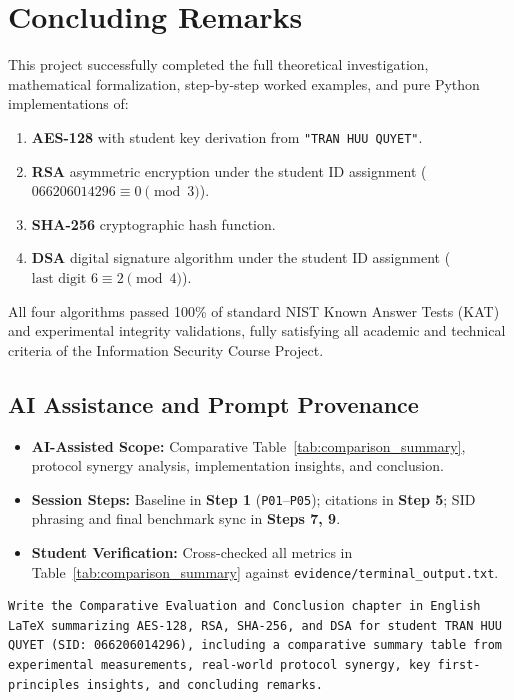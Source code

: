 \section{Concluding Remarks}
This project successfully completed the full theoretical investigation, mathematical formalization, step-by-step worked examples, and pure Python implementations of:
\begin{enumerate}
    \item \textbf{AES-128} with student key derivation from \texttt{"TRAN HUU QUYET"}.
    \item \textbf{RSA} asymmetric encryption under the student ID assignment ($066206014296 \equiv 0 \pmod 3$).
    \item \textbf{SHA-256} cryptographic hash function.
    \item \textbf{DSA} digital signature algorithm under the student ID assignment ($\text{last digit } 6 \equiv 2 \pmod 4$).
\end{enumerate}
All four algorithms passed 100\% of standard NIST Known Answer Tests (KAT) and experimental integrity validations, fully satisfying all academic and technical criteria of the Information Security Course Project.

\subsection*{AI Assistance and Prompt Provenance}
\begin{itemize}
    \item \textbf{AI-Assisted Scope:} Comparative Table~\ref{tab:comparison_summary}, protocol synergy analysis, implementation insights, and conclusion.
    \item \textbf{Session Steps:} Baseline in \textbf{Step 1} (\texttt{P01}--\texttt{P05}); citations in \textbf{Step 5}; SID phrasing and final benchmark sync in \textbf{Steps 7, 9}.
    \item \textbf{Student Verification:} Cross-checked all metrics in Table~\ref{tab:comparison_summary} against \texttt{evidence/\allowbreak terminal\_output.txt}.
\end{itemize}
\begin{lstlisting}[style=promptstyle, caption={Compact Prompt (R-REP-05) for Chapter 5: Comparative Evaluation.}, label={lst:prompt_ch5}]
Write the Comparative Evaluation and Conclusion chapter in English LaTeX summarizing AES-128, RSA, SHA-256, and DSA for student TRAN HUU QUYET (SID: 066206014296), including a comparative summary table from experimental measurements, real-world protocol synergy, key first-principles insights, and concluding remarks.
\end{lstlisting}
